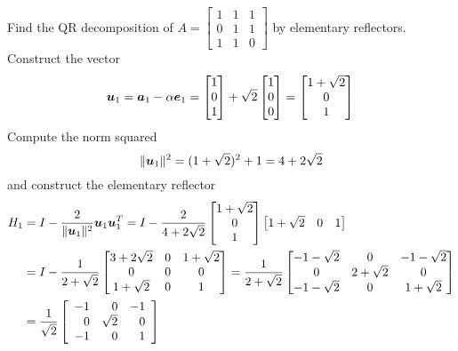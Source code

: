 \begin{example}
Find the QR decomposition of $A = \begin{bmatrix} 1 & 1 & 1 \\ 0 & 1 & 1 \\ 1 & 1 & 0 \end{bmatrix}$ by elementary reflectors. \\

Construct the vector
$$
\boldsymbol{u}_1 =  \boldsymbol{a}_1 - \alpha \boldsymbol{e}_1
= \begin{bmatrix} 1 \\ 0 \\ 1 \end{bmatrix} + \sqrt{2} \begin{bmatrix} 1 \\ 0 \\ 0 \end{bmatrix}
= \begin{bmatrix} 1 + \sqrt{2} \\ 0 \\ 1 \end{bmatrix} \\
$$
Compute the norm squared
$$
\| \boldsymbol{u}_1 \|^2 = (1 + \sqrt{2})^2 + 1 = 4 + 2\sqrt{2}
$$
and construct the elementary reflector
\begin{align*}
H_1 &= I - \frac{2}{\| \bs{u}_1 \|^2} \bs{u}_1 \bs{u}_1^T
= I - \frac{2}{4 + 2\sqrt{2}} \begin{bmatrix} 1 + \sqrt{2} \\ 0 \\ 1 \end{bmatrix} \begin{bmatrix} 1 + \sqrt{2} & 0 & 1 \end{bmatrix} \\
&= I - \frac{1}{2 + \sqrt{2}} \begin{bmatrix} 3 + 2\sqrt{2} & 0 & 1 + \sqrt{2} \\ 0 & 0 & 0 \\ 1 + \sqrt{2} & 0 & 1 \end{bmatrix}
= \frac{1}{2 + \sqrt{2}} \begin{bmatrix} - 1 - \sqrt{2} & 0 & - 1 - \sqrt{2} \\ 0 & 2 + \sqrt{2} & 0 \\ - 1 - \sqrt{2} & 0 & 1 + \sqrt{2} \end{bmatrix} \\
&= \frac{1}{\sqrt{2}} \left[ \begin{array}{rrr} - 1 & 0 & - 1 \\ 0 & \sqrt{2} & 0 \\ - 1 & 0 & 1 \end{array} \right]

\end{align*}
\end{example}
